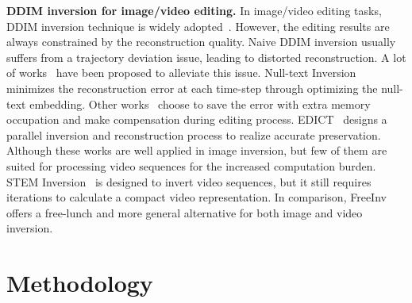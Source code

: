 \documentclass{article}
\begin{document}
\noindent \textbf{DDIM inversion for image/video editing.}
In image/video editing tasks, DDIM inversion technique is widely adopted~\cite{hertz2022prompt, cao2023masactrl, pnpDiffusion2023,geyer2023tokenflow, qi2023fatezero, liu2023video, bao2023latentwarp, hu2024animate, xu2024magicanimate, feng2024wave}. 
However, the editing results are always constrained by the reconstruction quality. Naive DDIM inversion usually suffers from a trajectory deviation issue, leading to distorted reconstruction.
A lot of works~\cite{mokady2022null, dong2023prompt, miyake2023negative, li2023stylediffusion, wallace2023edict, huberman2024edit, xu2023inversion, ju2024pnp, wang2024belm} have been proposed to alleviate this issue. Null-text Inversion~\cite{mokady2022null} minimizes the reconstruction error at each time-step through optimizing the null-text embedding.
Other works~\cite{ju2024pnp, xu2023inversion, duan2024tuning} choose to save the error with extra memory occupation and make compensation during editing process.
EDICT~\cite{wallace2023edict} designs a parallel inversion and reconstruction process to realize accurate preservation.
Although these works are well applied in image inversion, but few of them are suited for processing video sequences for the increased computation burden.
STEM Inversion~\cite{li2024video} is designed to invert video sequences, but it still requires iterations to calculate a compact video representation.
In comparison, FreeInv offers a free-lunch and more general alternative for both image and video inversion.


\section{Methodology}
\label{sec: method}
\end{document}

